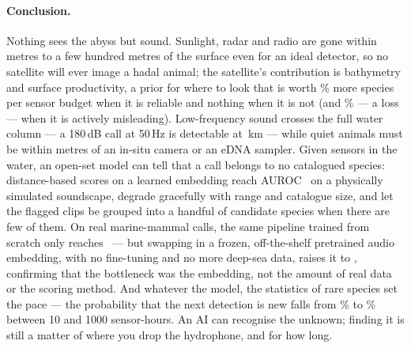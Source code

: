 \paragraph{Conclusion.} Nothing sees the abyss but sound. Sunlight, radar and
radio are gone within metres to a few hundred metres of the surface even for
an ideal detector, so no satellite will ever image a hadal animal; the
satellite's contribution is bathymetry and surface productivity, a prior for
where to look that is worth \SurGainNine\% more species per sensor budget
when it is reliable and nothing when it is not (and \SurGainZeroThreeFour\%
--- a loss --- when it is actively misleading). Low-frequency sound crosses
the full water column --- a 180\,dB call at 50\,Hz is detectable at
\RangeBaleenHyb\,km --- while quiet animals must be within metres of an in-situ
camera or an eDNA sampler. Given sensors in the water, an open-set model can
tell that a call belongs to no catalogued species: distance-based scores on a
learned embedding reach AUROC \NovBestAuroc\ on a physically simulated
soundscape, degrade gracefully with range and catalogue size, and let the
flagged clips be grouped into a handful of candidate species when there are
few of them. On real marine-mammal calls, the same pipeline trained from
scratch only reaches \RealBestAuroc\ --- but swapping in a frozen,
off-the-shelf pretrained audio embedding, with no fine-tuning and no more
deep-sea data, raises it to \RealPtBestAuroc, confirming that the
bottleneck was the embedding, not the amount of real data or the scoring
method. And whatever the model, the statistics of rare species set the
pace --- the probability that the next detection is new falls from
\SurDiscTen\% to \SurDiscThousand\% between 10 and 1000 sensor-hours. An AI
can recognise the unknown; finding it is still a matter of where you drop
the hydrophone, and for how long.
